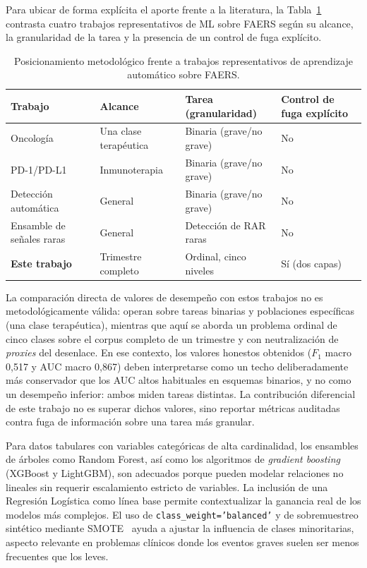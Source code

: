 \documentclass[12pt,a4paper]{article}
\begin{document}
Para ubicar de forma explícita el aporte frente a la literatura, la Tabla~\ref{tab:related_comparison} contrasta cuatro trabajos representativos de ML sobre FAERS según su alcance, la granularidad de la tarea y la presencia de un control de fuga explícito.

\begin{table}[H]
\centering
\caption{Posicionamiento metodológico frente a trabajos representativos de aprendizaje automático sobre FAERS.}
\label{tab:related_comparison}
\small
\begin{tabular}{@{}p{3.6cm}p{3.0cm}p{3.2cm}p{2.6cm}@{}}
\toprule
\textbf{Trabajo} & \textbf{Alcance} & \textbf{Tarea (granularidad)} & \textbf{Control de fuga explícito} \\
\midrule
Oncología~\cite{oncoSAE2026} & Una clase terapéutica & Binaria (grave/no grave) & No \\
PD-1/PD-L1~\cite{pd1faers2025} & Inmunoterapia & Binaria (grave/no grave) & No \\
Detección automática~\cite{automatingADE2024} & General & Binaria (grave/no grave) & No \\
Ensamble de señales raras~\cite{ensembleRare2026} & General & Detección de RAR raras & No \\
\textbf{Este trabajo} & Trimestre completo & Ordinal, cinco niveles & Sí (dos capas) \\
\bottomrule
\end{tabular}
\end{table}

La comparación directa de valores de desempeño con estos trabajos no es metodológicamente válida: operan sobre tareas binarias y poblaciones específicas (una clase terapéutica), mientras que aquí se aborda un problema ordinal de cinco clases sobre el corpus completo de un trimestre y con neutralización de \textit{proxies} del desenlace. En ese contexto, los valores honestos obtenidos (\(F_1\) macro 0,517 y AUC macro 0,867) deben interpretarse como un techo deliberadamente más conservador que los AUC altos habituales en esquemas binarios, y no como un desempeño inferior: ambos miden tareas distintas. La contribución diferencial de este trabajo no es superar dichos valores, sino reportar métricas auditadas contra fuga de información sobre una tarea más granular.

Para datos tabulares con variables categóricas de alta cardinalidad, los ensambles de árboles como Random Forest, así como los algoritmos de \textit{gradient boosting} (XGBoost y LightGBM), son adecuados porque pueden modelar relaciones no lineales sin requerir escalamiento estricto de variables. La inclusión de una Regresión Logística como línea base permite contextualizar la ganancia real de los modelos más complejos. El uso de \texttt{class\_weight='balanced'} y de sobremuestreo sintético mediante SMOTE~\cite{chawla2002} ayuda a ajustar la influencia de clases minoritarias, aspecto relevante en problemas clínicos donde los eventos graves suelen ser menos frecuentes que los leves.
\end{document}
